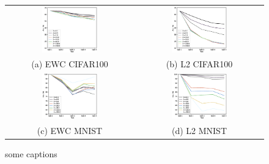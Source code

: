 \documentclass[final]{cvpr}
\begin{document}
\begin{figure}[t]
    \centering
	\begin{tabular}{c@{\hskip0.5cm}c}
		\includegraphics[width=0.45\textwidth]{resources/ewc_CIFAR.eps}&%
        \includegraphics[width=0.45\textwidth]{resources/l2_CIFAR.eps}\\%
        (a) EWC CIFAR100 & (b) L2 CIFAR100\\
        \includegraphics[width=0.45\textwidth]{resources/ewc_MNIST.eps}&%
        \includegraphics[width=0.45\textwidth]{resources/l2_MNIST.eps}\\%
		(c) EWC MNIST  & (d) L2 MNIST \\
	\end{tabular}\vspace{0.2cm}
	\caption{some captions}
	\label{fig:tsne}
\end{figure}
\end{document}

